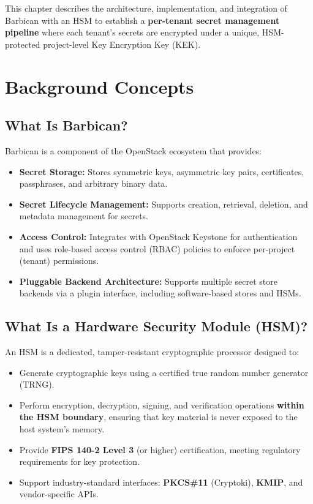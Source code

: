 \documentclass[12pt,a4paper,oneside]{report}
\begin{document}
This chapter describes the architecture, implementation, and integration of Barbican with an HSM to establish a \textbf{per-tenant secret management pipeline} where each tenant's secrets are encrypted under a unique, HSM-protected project-level Key Encryption Key (KEK).

\section{Background Concepts}

\subsection{What Is Barbican?}

Barbican is a component of the OpenStack ecosystem that provides:

\begin{itemize}
    \item \textbf{Secret Storage:} Stores symmetric keys, asymmetric key pairs, certificates, passphrases, and arbitrary binary data.
    \item \textbf{Secret Lifecycle Management:} Supports creation, retrieval, deletion, and metadata management for secrets.
    \item \textbf{Access Control:} Integrates with OpenStack Keystone for authentication and uses role-based access control (RBAC) policies to enforce per-project (tenant) permissions.
    \item \textbf{Pluggable Backend Architecture:} Supports multiple secret store backends via a plugin interface, including software-based stores and HSMs.
\end{itemize}

\subsection{What Is a Hardware Security Module (HSM)?}

An HSM is a dedicated, tamper-resistant cryptographic processor designed to:

\begin{itemize}
    \item Generate cryptographic keys using a certified true random number generator (TRNG).
    \item Perform encryption, decryption, signing, and verification operations \textbf{within the HSM boundary}, ensuring that key material is never exposed to the host system's memory.
    \item Provide \textbf{FIPS 140-2 Level 3} (or higher) certification, meeting regulatory requirements for key protection.
    \item Support industry-standard interfaces: \textbf{PKCS\#11} (Cryptoki), \textbf{KMIP}, and vendor-specific APIs.
\end{itemize}
\end{document}
